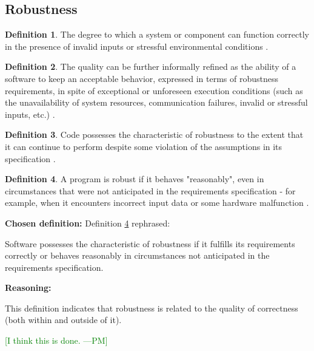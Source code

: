 \documentclass[letterpaper,cleveref]{lipics-v2019}
\newcommand{\authornote}[3]{\textcolor{#1}{[#3 ---#2]}}
\newcommand{\authornote}[3]{}
\newcommand{\pmi}[1]{\authornote{green}{PM}{#1}} %
\theoremstyle{definition}
\newtheorem{defn}{Definition}
\begin{document}
\subsection{Robustness}
\begin{defn}
  The degree to which a system or component can function correctly in the
  presence of invalid inputs or stressful environmental conditions
  \citep{IEEEStdGlossarySET1990}.
\end{defn}
\begin{defn}
  The quality can be further informally refined as the ability of a software to
  keep an acceptable behavior, expressed in terms of robustness requirements, in
  spite of exceptional or unforeseen execution conditions (such as the
  unavailability of system resources, communication failures, invalid or
  stressful inputs, etc.) \citep{fernandez2005model}.
\end{defn}
\begin{defn}
  Code possesses the characteristic of robustness to the extent that it can
  continue to perform despite some violation of the assumptions in its
  specification \citep{boehm2007software}.
\end{defn}
\begin{defn} \label{RobustnessDefnSelected}
  A program is robust if it behaves "reasonably", even in circumstances that
  were not anticipated in the requirements specification - for example, when it
  encounters incorrect input data or some hardware malfunction
  \citep{ghezzi1991fundamentals}.
\end{defn}

\noindent \textbf{Chosen definition:} Definition \ref{RobustnessDefnSelected} rephrased:

Software possesses the characteristic of robustness if it fulfills its requirements correctly or behaves reasonably in circumstances not anticipated in the requirements specification.

\noindent \textbf{Reasoning:}

This definition indicates that robustness is related to the quality of correctness (both within and outside of it). 

\pmi{I think this is done.}
\end{document}
